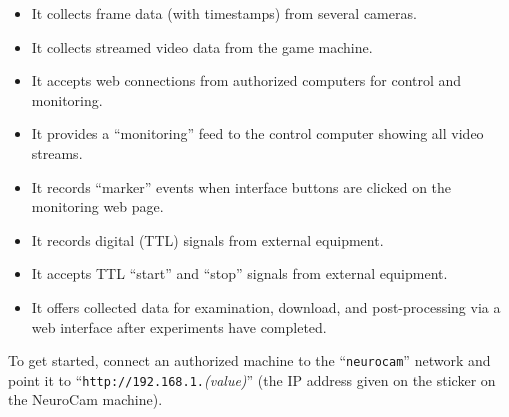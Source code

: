 \begin{itemize}

\item It collects frame data (with timestamps) from several cameras.

\item It collects streamed video data from the game machine.

\item It accepts web connections from authorized computers for control and
monitoring.

\item It provides a ``monitoring'' feed to the control computer showing
all video streams.

\item It records ``marker'' events when interface buttons are clicked on
the monitoring web page.

\item It records digital (TTL) signals from external equipment.

\item It accepts TTL ``start'' and ``stop'' signals from external equipment.

\item It offers collected data for examination, download, and
post-processing via a web interface after experiments have completed.

\end{itemize}

To get started, connect an authorized machine to the ``\verb+neurocam+''
network and point it to \linebreak
``\verb+http://192.168.1.+\textit{(value)}''
(the IP address given on the sticker on the NeuroCam machine).

%
